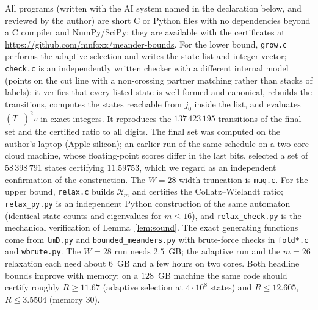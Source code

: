 \documentclass[11pt]{amsart}
\theoremstyle{definition}
\newcommand{\Rb}{\bar R}
\newcommand{\ttop}{^{\!\top}}
\newcommand{\Rel}{\mathcal R}
\begin{document}
All programs (written with the AI system named in the declaration below, and reviewed by the author) are short C or Python files with no dependencies beyond a C compiler and NumPy/SciPy; they are available with the certificates at \url{https://github.com/mnfoxx/meander-bounds}. For the lower bound, \texttt{grow.c} performs the adaptive selection and writes the state list and integer vector; \texttt{check.c} is an independently written checker with a different internal model (points on the cut line with a non-crossing partner matching rather than stacks of labels): it verifies that every listed state is well formed and canonical, rebuilds the transitions, computes the states reachable from $j_0$ inside the list, and evaluates $(T\ttop)^2v$ in exact integers. It reproduces the $137\,423\,195$ transitions of the final set and the certified ratio to all digits. The final set was computed on the author's laptop (Apple silicon); an earlier run of the same schedule on a two-core cloud machine, whose floating-point scores differ in the last bits, selected a set of $58\,398\,791$ states certifying $11.59753$, which we regard as an independent confirmation of the construction. The $W=28$ width truncation is \texttt{muq.c}. For the upper bound, \texttt{relax.c} builds $\Rel_m$ and certifies the Collatz--Wielandt ratio; \texttt{relax\_py.py} is an independent Python construction of the same automaton (identical state counts and eigenvalues for $m\le16$), and \texttt{relax\_check.py} is the mechanical verification of Lemma~\ref{lem:sound}. The exact generating functions come from \texttt{tmD.py} and \texttt{bounded\_meanders.py} with brute-force checks in \texttt{fold*.c} and \texttt{wbrute.py}. The $W=28$ run needs $2.5$~GB; the adaptive run and the $m=26$ relaxation each need about $6$~GB and a few hours on two cores. Both headline bounds improve with memory: on a $128$~GB machine the same code should certify roughly $R\ge11.67$ (adaptive selection at $4\cdot10^8$ states) and $R\le12.605$, $\Rb\le3.5504$ (memory $30$).
\end{document}
